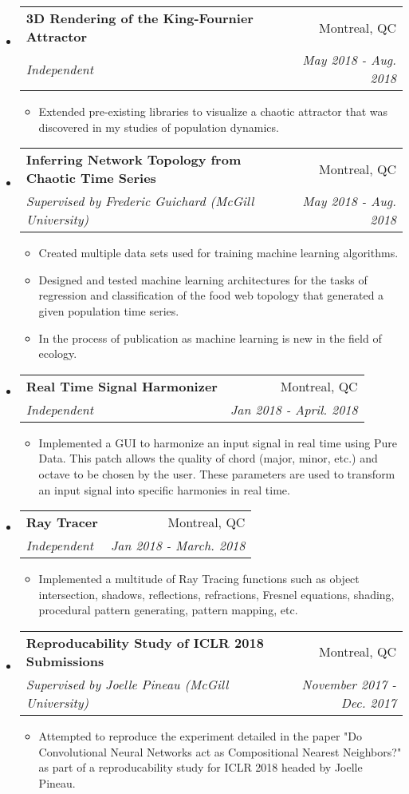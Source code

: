 \documentclass[letterpaper,11pt]{article}
\makeatletter
\newcommand{\resitem}[1]{\item #1 \vspace{-2pt}}
\newcommand{\ressubheading}[4]{
\begin{tabular*}{6.1in}{l@{\extracolsep{\fill}}r}
		\textbf{#1} & #2 \\
		\textit{#3} & \textit{#4} \\
\end{tabular*}\vspace{-1pt}}
\makeatother
\begin{document}
\begin{itemize}
\item
	\ressubheading{3D Rendering of the King-Fournier Attractor}{Montreal, QC}{Independent}{May 2018 - Aug. 2018}
	\begin{itemize}
		\resitem{Extended pre-existing libraries to visualize a chaotic attractor that was discovered in my studies of population dynamics.}
	\end{itemize}

\item
	\ressubheading{Inferring Network Topology from Chaotic Time Series}{Montreal, QC}{Supervised by Frederic Guichard (McGill University)}{May 2018 - Aug. 2018}
	\begin{itemize}
		\resitem{Created multiple data sets used for training machine learning algorithms.}
		\resitem{Designed and tested machine learning architectures for the tasks of regression and classification of the food web topology that generated a given population time series.}
		\resitem{In the process of publication as machine learning is new in the field of ecology.}
	\end{itemize}
	
\item
	\ressubheading{Real Time Signal Harmonizer}{Montreal, QC}{Independent}{Jan 2018 - April. 2018}
	\begin{itemize}
		\resitem{Implemented a GUI to harmonize an input signal in real time using Pure Data. This patch allows the quality of chord (major, minor, etc.) and octave to be chosen by the user. These parameters are used to transform an input signal into specific harmonies in real time.}
	\end{itemize}	
	
\item
	\ressubheading{Ray Tracer}{Montreal, QC}{Independent}{Jan 2018 - March. 2018}
	\begin{itemize}
		\resitem{Implemented a multitude of Ray Tracing functions such as object intersection, shadows, reflections, refractions, Fresnel equations, shading, procedural pattern generating, pattern mapping, etc.}
	\end{itemize}
	
\item
	\ressubheading{Reproducability Study of ICLR 2018 Submissions}{Montreal, QC}{Supervised by Joelle Pineau (McGill University)}{November 2017 - Dec. 2017}
	\begin{itemize}
		\resitem{Attempted to reproduce the experiment detailed in the paper "Do Convolutional Neural Networks act as Compositional Nearest Neighbors?" as part of a reproducability study for ICLR 2018 headed by Joelle Pineau.}
	\end{itemize}	
	

\end{itemize}
\end{document}
